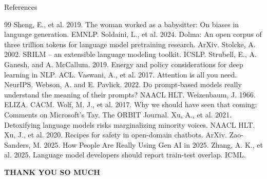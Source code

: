 \documentclass[aspectratio=169]{beamer}
\begin{document}
\begin{frame}[allowframebreaks]{References}
\begin{thebibliography}{99}
     Sheng, E., et al. 2019. The woman worked as a babysitter: On biases in language generation. EMNLP.
     Soldaini, L., et al. 2024. Dolma: An open corpus of three trillion tokens for language model pretraining research. ArXiv.
     Stolcke, A. 2002. SRILM – an extensible language modeling toolkit. ICSLP.
     Strubell, E., A. Ganesh, and A. McCallum. 2019. Energy and policy considerations for deep learning in NLP. ACL.
     Vaswani, A., et al. 2017. Attention is all you need. NeurIPS.
     Webson, A. and E. Pavlick. 2022. Do prompt-based models really understand the meaning of their prompts? NAACL HLT.
     Weizenbaum, J. 1966. ELIZA. CACM.
     Wolf, M. J., et al. 2017. Why we should have seen that coming: Comments on Microsoft’s Tay. The ORBIT Journal.
     Xu, A., et al. 2021. Detoxifying language models risks marginalizing minority voices. NAACL HLT.
     Xu, J., et al. 2020. Recipes for safety in open-domain chatbots. ArXiv.
     Zao-Sanders, M. 2025. How People Are Really Using Gen AI in 2025.
     Zhang, A. K., et al. 2025. Language model developers should report train-test overlap. ICML.
    
    \end{thebibliography}
\end{frame}

\begin{frame}
    \begin{center}
        \Large \textbf{THANK YOU SO MUCH}
    \end{center}
\end{frame}
\end{document}

